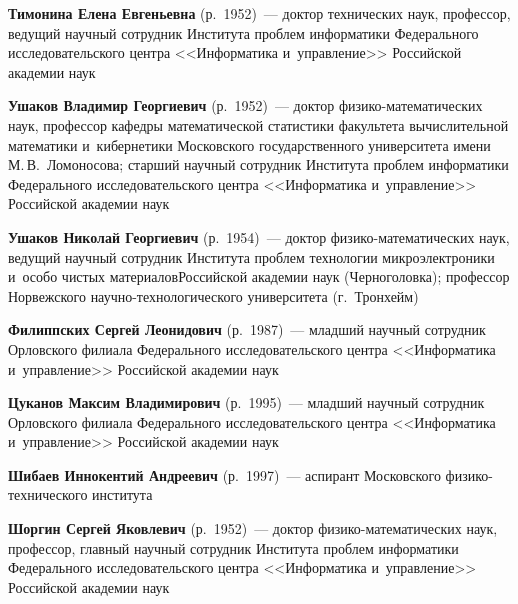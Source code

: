 \begin{multicols}{2}
\noindent
\textbf{Тимонина Елена Евгеньевна} (р.\ 1952)~--- 
доктор технических наук, профессор, ведущий научный со\-труд\-ник Института проб\-лем информатики Федерального
 исследовательского цент\-ра <<Информатика и~управ\-ле\-ние>> Российской академии наук

\noindent
\textbf{Ушаков Владимир Георгиевич} (р.\ 1952)~--- доктор фи\-зи\-ко-ма\-те\-ма\-ти\-че\-ских наук, профессор ка\-фед\-ры
математической статистики факультета вы\-чис\-ли\-тель\-ной математики и~кибернетики Московского
государственного университета имени М.\,В.~Ломоносова; старший научный сотрудник Института
проб\-лем информатики Федерального исследовательского центра <<Информатика и~управ\-ле\-ние>>
Российской академии наук

\noindent
\textbf{Ушаков Николай Георгиевич} (р.\ 1954)~--- доктор
фи\-зи\-ко-ма\-те\-ма\-ти\-че\-ских наук, ведущий научный
сотрудник Института проб\-лем технологии микроэлектроники 
и~особо чис\-тых материалов\linebreak \mbox{Российской} академии наук (Черноголовка); профессор
Норвежского на\-уч\-но-тех\-но\-ло\-ги\-че\-ско\-го университета (г.~Трон\-хейм)

\noindent
\textbf{Филиппских Сергей Леонидович} (р.\ 1987)~--- 
младший научный сотрудник Орловского филиала Федерального исследовательского цент\-ра <<Информатика и~управ\-ле\-ние>>
 Российской академии наук

\noindent
\textbf{Цуканов Максим Владимирович} (р.\ 1995)~--- 
младший научный сотрудник Орловского филиала Федерального исследовательского цент\-ра <<Информатика и~управ\-ле\-ние>>
 Российской академии наук

\noindent
\textbf{Шибаев Иннокентий Андреевич} (р.\ 1997)~--- аспирант Московского фи\-зи\-ко-тех\-ни\-че\-ско\-го института

\noindent
\textbf{Шоргин Сергей Яковлевич} (р.\ 1952)~--- доктор фи\-зи\-ко-ма\-те\-ма\-ти\-че\-ских наук, 
профессор, главный научный сотрудник Института проб\-лем информатики Федерального исследовательского цент\-ра <<Информатика и~управ\-ле\-ние>>
 Российской академии наук
 









\def\leftkol{ОБ АВТОРАХ}

\def\rightkol{ОБ АВТОРАХ}


 \label{end\stat}



\end{multicols}

\def\leftkol{ОБ АВТОРАХ}
\def\rightkol{ОБ АВТОРАХ}

\newpage